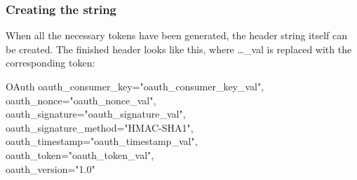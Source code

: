 \subsubsection{Creating the string}
When all the necessary tokens have been generated, the header string itself can
be created. The finished header looks like this, where \ldots\_val is replaced
with the corresponding token:\nl

OAuth oauth\_consumer\_key="oauth\_consumer\_key\_val",\\
oauth\_nonce="oauth\_nonce\_val", \\
oauth\_signature="oauth\_signature\_val", \\
oauth\_signature\_method="HMAC-SHA1", \\
oauth\_timestamp="oauth\_timestamp\_val", \\
oauth\_token="oauth\_token\_val", \\
oauth\_version="1.0" \\
\citep{TwitterAPIAuth}